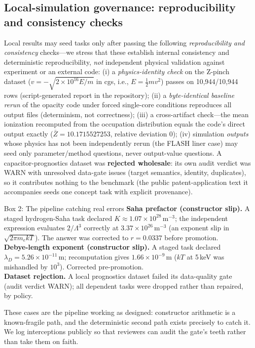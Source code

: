\subsection{Local-simulation governance: reproducibility and consistency checks}
Local results may seed tasks only after passing the following \emph{reproducibility and consistency} checks---we stress that these establish internal consistency and deterministic reproducibility, \emph{not} independent physical validation against experiment or an external code: (i) a \emph{physics-identity check} on the Z-pinch dataset ($v=-\sqrt{2\times10^{16}E/m}$ in cgs, i.e., $E=\tfrac12 mv^2$) passes on 10{,}944/10{,}944 rows (script-generated report in the repository); (ii) a \emph{byte-identical baseline rerun} of the opacity code under forced single-core conditions reproduces all output files (determinism, not correctness); (iii) a cross-artifact check---the mean ionization recomputed from the occupation distribution equals the code's direct output exactly ($\bar Z=10.1715527253$, relative deviation 0); (iv) simulation \emph{outputs} whose physics has not been independently rerun (the FLASH liner case) may seed only parameter/method questions, never output-value questions. A capacitor-prognostics dataset was \textbf{rejected wholesale}: its own audit verdict was WARN with unresolved data-gate issues (target semantics, identity, duplicates), so it contributes nothing to the benchmark (the public patent-application text it accompanies seeds one concept task with explicit provenance).

\begin{examplebox}{Box 2: The pipeline catching real errors}
\small
\textbf{Saha prefactor (constructor slip).} A staged hydrogen-Saha task declared $K\approx1.07\times10^{28}\,\mathrm{m^{-3}}$; the independent expression evaluates $2/\Lambda^3$ correctly at $3.37\times10^{26}\,\mathrm{m^{-3}}$ (an exponent slip in $\sqrt{2\pi m_e kT}$). The answer was corrected to $r=0.0337$ before promotion.\\[3pt]
\textbf{Debye-length exponent (constructor slip).} A staged task declared $\lambda_D=5.26\times10^{-11}$\,m; recomputation gives $1.66\times10^{-9}$\,m ($kT$ at 5\,keV was mishandled by $10^3$). Corrected pre-promotion.\\[3pt]
\textbf{Dataset rejection.} A local prognostics dataset failed its data-quality gate (audit verdict WARN); all dependent tasks were dropped rather than repaired, by policy.
\end{examplebox}

These cases are the pipeline working as designed: constructor arithmetic is a known-fragile path, and the deterministic second path exists precisely to catch it. We log interceptions publicly so that reviewers can audit the gate's teeth rather than take them on faith.
